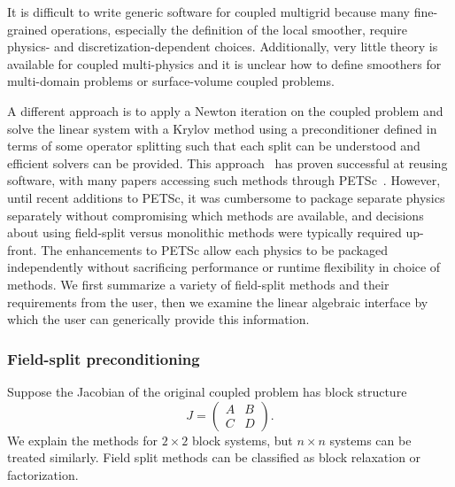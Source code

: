 It is difficult to write generic software for coupled multigrid because many fine-grained operations, especially the definition of the local smoother, require physics- and discretization-dependent choices.
Additionally, very little theory is available for coupled multi-physics and it is unclear how to define smoothers for multi-domain problems or surface-volume coupled problems.

A different approach is to apply a Newton iteration on the coupled problem and solve the linear system with a Krylov method using a preconditioner defined in terms of some operator splitting such that each split can be understood and efficient solvers can be provided.
This approach~\cite{knoll2004jfn} has proven successful at reusing software, with many papers accessing such methods through PETSc~\cite{petsc-web-page}.
However, until recent additions to PETSc, it was cumbersome to package separate physics separately without compromising which methods are available, and decisions about using field-split versus monolithic methods were typically required up-front.
The enhancements to PETSc allow each physics to be packaged independently without sacrificing performance or runtime flexibility in choice of methods.
We first summarize a variety of field-split methods and their requirements from the user, then we examine the linear algebraic interface by which the user can generically provide this information.

\subsubsection{Field-split preconditioning}
Suppose the Jacobian of the original coupled problem has block structure
\begin{equation}\label{eq:fieldsplit:jacobian}
  J = \begin{pmatrix} A & B \\ C & D \end{pmatrix} .
\end{equation}
We explain the methods for $2\times 2$ block systems, but $n\times n$ systems can be treated similarly.
Field split methods can be classified as block relaxation or factorization.

